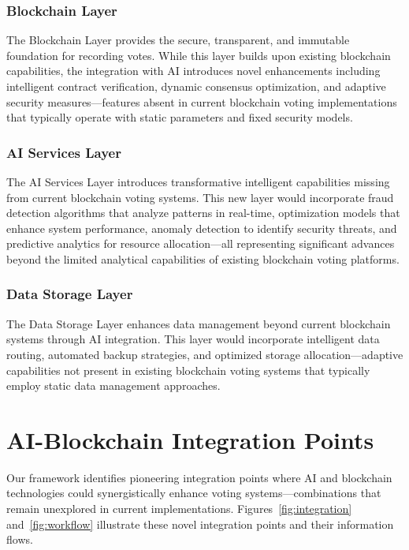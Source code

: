 \documentclass[conference]{IEEEtran}
\begin{document}
\subsubsection{Blockchain Layer}
The Blockchain Layer provides the secure, transparent, and immutable foundation for recording votes. While this layer builds upon existing blockchain capabilities, the integration with AI introduces novel enhancements including intelligent contract verification, dynamic consensus optimization, and adaptive security measures—features absent in current blockchain voting implementations that typically operate with static parameters and fixed security models.

\subsubsection{AI Services Layer}
The AI Services Layer introduces transformative intelligent capabilities missing from current blockchain voting systems. This new layer would incorporate fraud detection algorithms that analyze patterns in real-time, optimization models that enhance system performance, anomaly detection to identify security threats, and predictive analytics for resource allocation—all representing significant advances beyond the limited analytical capabilities of existing blockchain voting platforms.

\subsubsection{Data Storage Layer}
The Data Storage Layer enhances data management beyond current blockchain systems through AI integration. This layer would incorporate intelligent data routing, automated backup strategies, and optimized storage allocation—adaptive capabilities not present in existing blockchain voting systems that typically employ static data management approaches.

\section{AI-Blockchain Integration Points}
Our framework identifies pioneering integration points where AI and blockchain technologies could synergistically enhance voting systems—combinations that remain unexplored in current implementations. Figures~\ref{fig:integration} and~\ref{fig:workflow} illustrate these novel integration points and their information flows.
\end{document}
